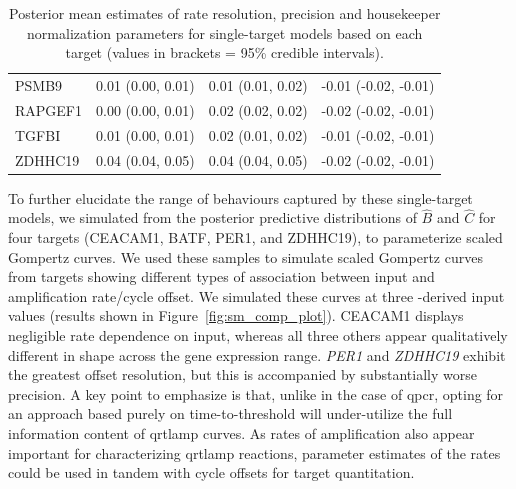 \documentclass[../thesis.tex]{subfiles}
\begin{document}
\begin{table}[!t]
{\begin{tabular}{|l|lll|}
PSMB9 & 0.01 (0.00, 0.01) & 0.01 (0.01, 0.02) & -0.01 (-0.02, -0.01) \\ 
RAPGEF1 & 0.00  (0.00, 0.01) & 0.02 (0.02, 0.02) & -0.02 (-0.02, -0.01)\\ 
TGFBI & 0.01 (0.00, 0.01) & 0.02 (0.01, 0.02) & -0.01 (-0.02, -0.01) \\ 
ZDHHC19 & 0.04 (0.04, 0.05) & 0.04 (0.04, 0.05) & -0.02 (-0.02, -0.01) \\ 
\hline
\end{tabular}}
\caption{Posterior mean estimates of rate resolution, precision and housekeeper normalization parameters for single-target models based on each target (values in brackets = 95\% credible intervals).\label{tab:single_target_sens_prec_b}}
\end{table}

To further elucidate the range of behaviours captured by these single-target models, we simulated from the posterior predictive distributions of $\hat{B}$ and $\hat{C}$ for four targets ({CEACAM1}, {BATF}, {PER1}, and {ZDHHC19}), to parameterize scaled Gompertz curves. We used these samples to simulate scaled Gompertz curves from targets showing different types of association between  input and amplification rate/cycle offset. We simulated these curves at three -derived  input values (results shown in Figure~\ref{fig:sm_comp_plot}). CEACAM1 displays negligible rate dependence on  input, whereas all three others appear qualitatively different in shape across the gene expression range. \emph{PER1} and \emph{ZDHHC19} exhibit the greatest offset resolution, but this is accompanied by substantially worse precision. A key point to emphasize is that, unlike in the case of \gls{qpcr}, opting for an approach based purely on time-to-threshold will under-utilize the full information content of \gls{qrtlamp} curves. As rates of amplification also appear important for characterizing \gls{qrtlamp} reactions, parameter estimates of the rates could be used in tandem with cycle offsets for target quantitation.
\end{document}
